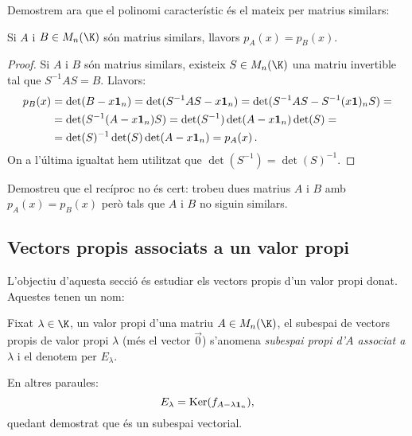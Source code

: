 Demostrem ara que el polinomi característic és el mateix per matrius similars:
\begin{proposicio}
    Si $A$ i $B\in M_n(\K)$ són matrius similars, llavors $p_A(x)=p_B(x)$.
\end{proposicio}
\begin{proof}
Si $A$ i $B$ són matrius similars, existeix $S\in M_n(\K)$ una matriu invertible tal que $S^{-1}AS=B$. Llavors:
\begin{align*}
p_B(x) & =\det(B-x\mathbf{1}_n)=\det(S^{-1}AS-x\mathbf{1}_n)=\det(S^{-1}AS-S^{-1}(x\mathbf{1})_nS)=\\ & = \det(S^{-1}(A-x\mathbf{1}_n)S)= \det(S^{-1})\det(A-x\mathbf{1}_n)\det(S)=\\
 & = \det(S)^{-1}\det(S)\det(A-x\mathbf{1}_n) = p_A(x) \, .
    \end{align*}
On a l'última igualtat hem utilitzat que $\det(S^{-1})=\det(S)^{-1}$.
\end{proof}
\begin{exercici}
Demostreu que el recíproc no és cert: trobeu dues matrius $A$ i $B$ amb $p_A(x)=p_B(x)$ però tals que $A$ i $B$ no siguin similars.
\end{exercici}

\subsection{Vectors propis associats a un valor propi}
L'objectiu d'aquesta secció és estudiar els vectors propis d'un valor propi donat. Aquestes tenen un nom:
\begin{definicio}
Fixat $\lambda\in\K$, un valor propi d'una matriu $A\in M_n(\K)$, el subespai de vectors propis de valor propi $\lambda$ (més el vector $\vec 0$) s'anomena \emph{subespai propi d'$A$ associat a $\lambda$} i el denotem per $E_\lambda$.
\end{definicio}
En altres paraules:
$$
E_\lambda=\operatorname{Ker}(f_{A-\lambda\mathbf{1}_n}) ,
$$
quedant demostrat que és un subespai vectorial.

